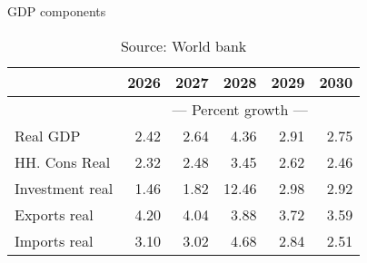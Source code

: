 \documentclass{article}
\begin{document}
\begin{table}[ht]
\caption{GDP components}
\begin{tabular}{lrrrrr}
\toprule
 & 2026 & 2027 & 2028 & 2029 & 2030 \\
\midrule
&\multicolumn{5}{c}{{---  Percent growth ---}}                          \\
Real GDP & 2.42 & 2.64 & 4.36 & 2.91 & 2.75 \\
HH. Cons Real & 2.32 & 2.48 & 3.45 & 2.62 & 2.46 \\
Investment real & 1.46 & 1.82 & 12.46 & 2.98 & 2.92 \\
Exports real & 4.20 & 4.04 & 3.88 & 3.72 & 3.59 \\
Imports real & 3.10 & 3.02 & 4.68 & 2.84 & 2.51 \\
\bottomrule
\end{tabular}
\caption*{Source: World bank }
\end{table}
\end{document}
